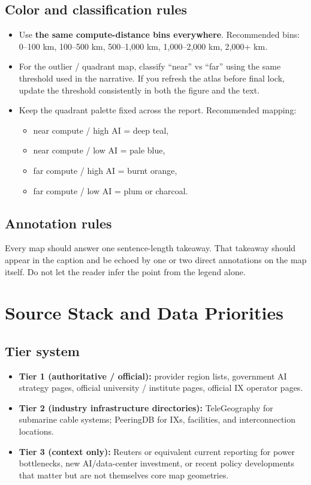 \documentclass[11pt]{article}
\begin{document}
\subsection{Color and classification rules}
\begin{itemize}[leftmargin=1.4em,itemsep=0.25em]
    \item Use \textbf{the same compute-distance bins everywhere}. Recommended bins: 0--100 km, 100--500 km, 500--1{,}000 km, 1{,}000--2{,}000 km, 2{,}000+ km.
    \item For the outlier / quadrant map, classify ``near'' vs ``far'' using the same threshold used in the narrative. If you refresh the atlas before final lock, update the threshold consistently in both the figure and the text.
    \item Keep the quadrant palette fixed across the report. Recommended mapping:
    \begin{itemize}[leftmargin=1.4em,itemsep=0.15em]
        \item near compute / high AI = deep teal,
        \item near compute / low AI = pale blue,
        \item far compute / high AI = burnt orange,
        \item far compute / low AI = plum or charcoal.
    \end{itemize}
\end{itemize}

\subsection{Annotation rules}
Every map should answer one sentence-length takeaway. That takeaway should appear in the caption and be echoed by one or two direct annotations on the map itself. Do not let the reader infer the point from the legend alone.

\section{Source Stack and Data Priorities}

\subsection{Tier system}
\begin{itemize}[leftmargin=1.4em,itemsep=0.25em]
    \item \textbf{Tier 1 (authoritative / official):} provider region lists, government AI strategy pages, official university / institute pages, official IX operator pages.
    \item \textbf{Tier 2 (industry infrastructure directories):} TeleGeography for submarine cable systems; PeeringDB for IXs, facilities, and interconnection locations.
    \item \textbf{Tier 3 (context only):} Reuters or equivalent current reporting for power bottlenecks, new AI/data-center investment, or recent policy developments that matter but are not themselves core map geometries.
\end{itemize}
\end{document}
